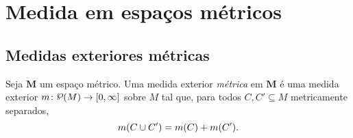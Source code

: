 \section{Medida em espaços métricos}

\subsection{Medidas exteriores métricas}

\begin{definition}
Seja $\bm M$ um espaço métrico. Uma medida exterior \emph{métrica} em $\bm M$ é uma medida exterior $\med\colon \p(M) \to \intff{0}{\infty}$ sobre $M$ tal que, para todos $C,C' \subseteq M$ metricamente separados,
	\begin{equation*}
	m(C \cup C') = m(C) + m(C').
	\end{equation*}
\end{definition}

